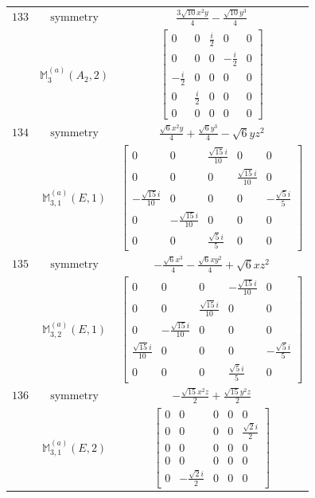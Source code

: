 \documentclass[fleqn,8pt,landscape]{jsarticle}
\begin{document}
\begin{longtable}{ccc}
$ 133 $ & $ \text{symmetry} $ & $ \frac{3 \sqrt{10} x^{2} y}{4} - \frac{\sqrt{10} y^{3}}{4} $ \\
$  $ & $ \mathbb{M}_{3}^{(a)}(A_{2},2) $ & $ \begin{bmatrix} 0 & 0 & \frac{i}{2} & 0 & 0 \\ 0 & 0 & 0 & - \frac{i}{2} & 0 \\ - \frac{i}{2} & 0 & 0 & 0 & 0 \\ 0 & \frac{i}{2} & 0 & 0 & 0 \\ 0 & 0 & 0 & 0 & 0 \end{bmatrix} $ \\ \hline
$ 134 $ & $ \text{symmetry} $ & $ \frac{\sqrt{6} x^{2} y}{4} + \frac{\sqrt{6} y^{3}}{4} - \sqrt{6} y z^{2} $ \\
$  $ & $ \mathbb{M}_{3,1}^{(a)}(E,1) $ & $ \begin{bmatrix} 0 & 0 & \frac{\sqrt{15} i}{10} & 0 & 0 \\ 0 & 0 & 0 & \frac{\sqrt{15} i}{10} & 0 \\ - \frac{\sqrt{15} i}{10} & 0 & 0 & 0 & - \frac{\sqrt{5} i}{5} \\ 0 & - \frac{\sqrt{15} i}{10} & 0 & 0 & 0 \\ 0 & 0 & \frac{\sqrt{5} i}{5} & 0 & 0 \end{bmatrix} $ \\ \hline
$ 135 $ & $ \text{symmetry} $ & $ - \frac{\sqrt{6} x^{3}}{4} - \frac{\sqrt{6} x y^{2}}{4} + \sqrt{6} x z^{2} $ \\
$  $ & $ \mathbb{M}_{3,2}^{(a)}(E,1) $ & $ \begin{bmatrix} 0 & 0 & 0 & - \frac{\sqrt{15} i}{10} & 0 \\ 0 & 0 & \frac{\sqrt{15} i}{10} & 0 & 0 \\ 0 & - \frac{\sqrt{15} i}{10} & 0 & 0 & 0 \\ \frac{\sqrt{15} i}{10} & 0 & 0 & 0 & - \frac{\sqrt{5} i}{5} \\ 0 & 0 & 0 & \frac{\sqrt{5} i}{5} & 0 \end{bmatrix} $ \\ \hline
$ 136 $ & $ \text{symmetry} $ & $ - \frac{\sqrt{15} x^{2} z}{2} + \frac{\sqrt{15} y^{2} z}{2} $ \\
$  $ & $ \mathbb{M}_{3,1}^{(a)}(E,2) $ & $ \begin{bmatrix} 0 & 0 & 0 & 0 & 0 \\ 0 & 0 & 0 & 0 & \frac{\sqrt{2} i}{2} \\ 0 & 0 & 0 & 0 & 0 \\ 0 & 0 & 0 & 0 & 0 \\ 0 & - \frac{\sqrt{2} i}{2} & 0 & 0 & 0 \end{bmatrix} $ \\ \hline

\end{longtable}
\end{document}
